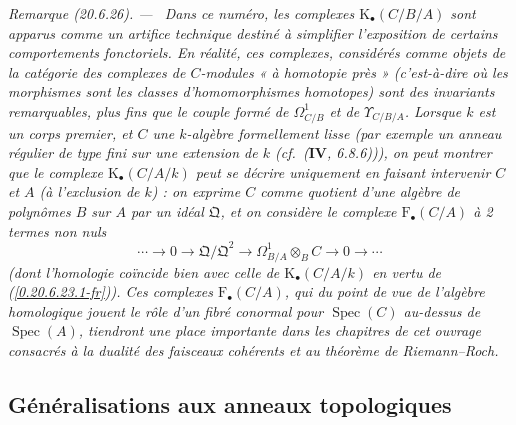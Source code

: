 \documentclass[10pt,oneside]{book}
\makeatletter
\newcommand{\sref}[1]{(\ref{#1})}
\newcommand{\setmanualcurrentlabel}[1]{\def\@currentlabel{#1}}
\newcommand{\oldpage}[2][]{%
  \setcounter{footnote}{0}%
  \marginpar{\scriptsize\textbf{#1}~|~#2}\ignorespaces}
\newenvironment{remark}[1][]{%
  \setmanualcurrentlabel{#1}\par\medskip\noindent\itshape Remarque (#1). ---\ }{\par}
\makeatother
\begin{document}
\begin{remark}[20.6.26]
\label{0.20.6.26-fr}
Dans ce numéro, les complexes $\mathrm{K}_\bullet(C/B/A)$ sont apparus comme
un artifice technique destiné à simplifier l'exposition de certains
comportements fonctoriels. En réalité, ces complexes, considérés comme objets
de la catégorie des
\oldpage[0\textsubscript{IV-1}]{147}
complexes de $C$-modules « à homotopie près » (c'est-à-dire où les morphismes
sont les classes d'homomorphismes homotopes) sont des invariants remarquables,
plus fins que le couple formé de $\Omega^1_{C/B}$ et de
$\Upsilon_{C/B/A}$. Lorsque $k$ est un corps premier, et $C$ une $k$-algèbre
formellement lisse (par exemple un anneau régulier de type fini sur une
extension de $k$ (cf.\ ($\mathbf{IV}$, 6.8.6))), on peut montrer que le
complexe $\mathrm{K}_\bullet(C/A/k)$ peut se décrire uniquement en faisant
intervenir $C$ et $A$ (à l'exclusion de $k$) : on exprime $C$ comme quotient
d'une algèbre de polynômes $B$ sur $A$ par un idéal $\mathfrak{Q}$, et on
considère le complexe $\mathrm{F}_\bullet(C/A)$ à 2 termes non nuls
\[
  \cdots\to0\to\mathfrak{Q}/\mathfrak{Q}^2\to
  \Omega^1_{B/A}\otimes_B C\to0\to\cdots
\]
(dont l'homologie coïncide bien avec celle de
$\mathrm{K}_\bullet(C/A/k)$ en vertu de \sref{0.20.6.23.1-fr}). Ces
complexes $\mathrm{F}_\bullet(C/A)$, qui du point de vue de l'algèbre
homologique jouent le rôle d'un fibré conormal pour $\operatorname{Spec}(C)$
au-dessus de $\operatorname{Spec}(A)$, tiendront une place importante dans
les chapitres de cet ouvrage consacrés à la dualité des faisceaux cohérents et
au théorème de Riemann--Roch.
\end{remark}

\subsection{Généralisations aux anneaux topologiques}
\label{subsection:0.20.7-fr}
\end{document}
